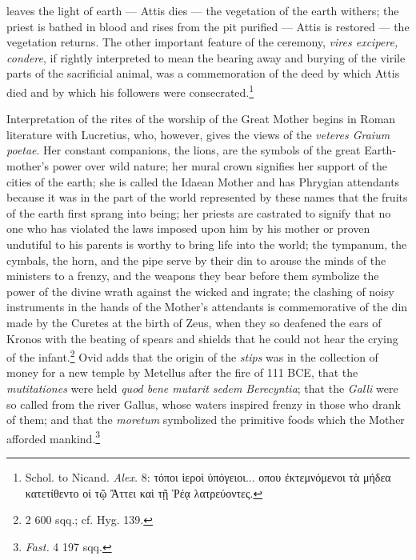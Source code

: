 \documentclass[a4paper, 11pt, oneside, polutonikogreek, english]{article}
\begin{document}
leaves the light of earth --- Attis dies --- the vegetation of the earth withers; the priest is bathed in blood and rises from the pit purified --- Attis is restored --- the vegetation returns. The other important feature of the ceremony, \emph{vires excipere, condere}, if rightly interpreted to mean the bearing away and burying of the virile parts of the sacrificial animal, was a commemoration of the deed by which Attis died and by which his followers were consecrated.\footnote{Schol. to Nicand. \emph{Alex.} 8: τόποι ἱεροὶ ὑπόγειοι... οπου ἐκτεμνόμενοι τὰ μήδεα κατετίθεντο οἱ τῷ Ἄττει καὶ τῇ Ῥέᾳ λατρεύοντες.}

Interpretation of the rites of the worship of the Great Mother begins in Roman literature with Lucretius, who, however, gives the views of the \emph{veteres Graium poetae}. Her constant companions, the lions, are the symbols of the great Earth-mother's power over wild nature; her mural crown signifies her support of the cities of the earth; she is called the Idaean Mother and has Phrygian attendants because it was in the part of the world represented by these names that the fruits of the earth first sprang into being; her priests are castrated to signify that no one who has violated the laws imposed upon him by his mother or proven undutiful to his parents is worthy to bring life into the world; the tympanum, the cymbals, the horn, and the pipe serve by their din to arouse the minds of the ministers to a frenzy, and the weapons they bear before them symbolize the power of the divine wrath against the wicked and ingrate; the clashing of noisy instruments in the hands of the Mother's attendants is commemorative of the din made by the Curetes at the birth of Zeus, when they so deafened the ears of Kronos with the beating of spears and shields that he could not hear the crying of the infant.\footnote{2 600 sqq.; cf. Hyg. 139.} Ovid adds that the origin of the \emph{stips} was in the collection of money for a new temple by Metellus after the fire of 111 \textsc{BCE}, that the \emph{mutitationes} were held \emph{quod bene mutarit sedem Berecyntia}; that the \emph{Galli} were so called from the river Gallus, whose waters inspired frenzy in those who drank of them; and that the \emph{moretum} symbolized the primitive foods which the Mother afforded mankind.\footnote{\emph{Fast.} 4 197 sqq.}
\end{document}
